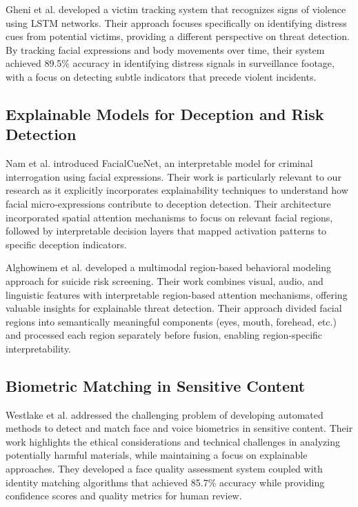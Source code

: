 \documentclass[conference,compsoc]{IEEEtran}
\begin{document}
Gheni et al. \cite{gheni2024} developed a victim tracking system that recognizes signs of violence using LSTM networks. Their approach focuses specifically on identifying distress cues from potential victims, providing a different perspective on threat detection. By tracking facial expressions and body movements over time, their system achieved 89.5\% accuracy in identifying distress signals in surveillance footage, with a focus on detecting subtle indicators that precede violent incidents.

\subsection{Explainable Models for Deception and Risk Detection}
Nam et al. \cite{nam2023} introduced FacialCueNet, an interpretable model for criminal interrogation using facial expressions. Their work is particularly relevant to our research as it explicitly incorporates explainability techniques to understand how facial micro-expressions contribute to deception detection. Their architecture incorporated spatial attention mechanisms to focus on relevant facial regions, followed by interpretable decision layers that mapped activation patterns to specific deception indicators.

Alghowinem et al. \cite{alghowinem2023} developed a multimodal region-based behavioral modeling approach for suicide risk screening. Their work combines visual, audio, and linguistic features with interpretable region-based attention mechanisms, offering valuable insights for explainable threat detection. Their approach divided facial regions into semantically meaningful components (eyes, mouth, forehead, etc.) and processed each region separately before fusion, enabling region-specific interpretability.

\subsection{Biometric Matching in Sensitive Content}
Westlake et al. \cite{westlake2022} addressed the challenging problem of developing automated methods to detect and match face and voice biometrics in sensitive content. Their work highlights the ethical considerations and technical challenges in analyzing potentially harmful materials, while maintaining a focus on explainable approaches. They developed a face quality assessment system coupled with identity matching algorithms that achieved 85.7\% accuracy while providing confidence scores and quality metrics for human review.
\end{document}

